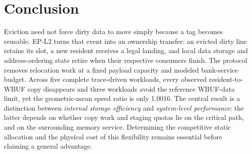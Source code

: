 \documentclass[conference,letterpaper]{IEEEtran}
\begin{document}
\section{Conclusion}
Eviction need not force dirty data to move simply because a tag becomes reusable. EP-L2 turns that event into an ownership transfer: an evicted dirty line retains its slot, a new resident receives a legal landing, and local data storage and address-ordering state retire when their respective consumers finish. The protocol removes relocation work at a fixed payload capacity and modeled bank-service budget. Across five complete trace-driven workloads, every observed resident-to-WBUF copy disappears and three workloads avoid the reference WBUF-data limit, yet the geometric-mean speed ratio is only 1.0016. The central result is a distinction between \emph{internal storage efficiency} and \emph{system-level performance}: the latter depends on whether copy work and staging quotas lie on the critical path, and on the surrounding memory service. Determining the competitive static allocation and the physical cost of this flexibility remains essential before claiming a general advantage.

\clearpage


\end{document}
